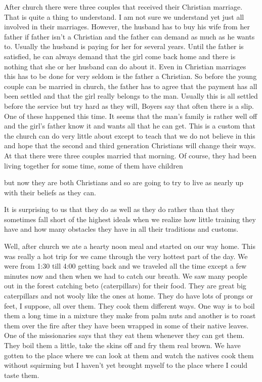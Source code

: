 \documentclass[
]{book}
\begin{document}
After church there were three couples that received their Christian marriage. That is quite a thing to understand. I am not sure we understand yet just all involved in their marriages. However, the husband has to buy his wife from her father if father isn't a Christian and the father can demand as much as he wants to. Usually the husband is paying for her for several years. Until the father is satisfied, he can always demand that the girl come back home and there is nothing that she or her husband can do about it. Even in Christian marriages this has to be done for very seldom is the father a Christian. So before the young couple can be married in church, the father has to agree that the payment has all been settled and that the girl really belongs to the man. Usually this is all settled before the service but try hard as they will, Boyers say that often there is a slip. One of these happened this time. It seems that the man's family is rather well off and the girl's father know it and wants all that he can get. This is a custom that the church can do very little about except to teach that we do not believe in this and hope that the second and third generation Christians will change their ways. At that there were three couples married that morning. Of course, they had been living together for some time, some of them have children

but now they are both Christians and so are going to try to live as nearly up with their beliefs as they can.

It is surprising to us that they do as well as they do rather than that they sometimes fall short of the highest ideals when we realize how little training they have and how many obstacles they have in all their traditions and customs.

Well, after church we ate a hearty noon meal and started on our way home. This was really a hot trip for we came through the very hottest part of the day. We were from 1:30 till 4:00 getting back and we traveled all the time except a few minutes now and then when we had to catch our breath. We saw many people out in the forest catching beto (caterpillars) for their food. They are great big caterpillars and not wooly like the ones at home. They do have lots of prongs or feet, I suppose, all over them. They cook them different ways. One way is to boil them a long time in a mixture they make from palm nuts and another is to roast them over the fire after they have been wrapped in some of their native leaves. One of the missionaries says that they eat them whenever they can get them. They boil them a little, take the skins off and fry them real brown. We have gotten to the place where we can look at them and watch the natives cook them without squirming but I haven't yet brought myself to the place where I could taste them.
\end{document}
